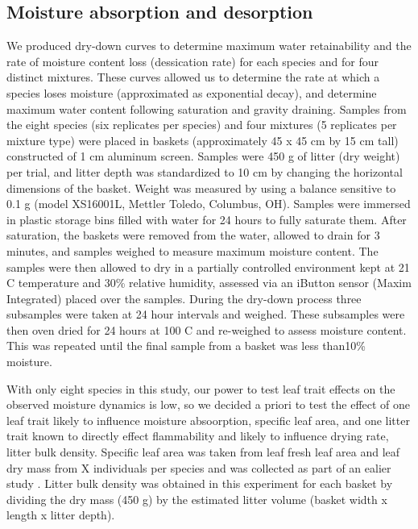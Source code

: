 \documentclass[fire,article,submit,moreauthors,pdftex]{Definitions/mdpi}
\begin{document}
\subsection{Moisture absorption and desorption}


We produced dry-down curves to determine maximum water retainability and the rate of moisture content loss (dessication rate) for each species and for four distinct mixtures. These curves allowed us to  determine the rate at which a species loses moisture (approximated as
exponential decay), and determine maximum water content following saturation
and gravity draining. Samples from the eight species (six replicates per
species) and four mixtures (5 replicates per mixture type) were placed in
baskets (approximately 45 x 45 cm by 15 cm tall) constructed of 1 cm aluminum
screen. Samples were 450 g of litter (dry weight) per trial, and litter depth
was standardized to 10 cm by changing the horizontal dimensions of the basket.
Weight was measured by using a balance sensitive to 0.1 g (model XS16001L,
Mettler Toledo, Columbus, OH). Samples were immersed in plastic storage bins
filled with water for 24 hours to fully saturate them. After saturation, the
baskets were removed from the water, allowed to drain for 3 minutes, and
samples weighed to measure maximum moisture content. The samples were then
allowed to dry in a partially controlled environment kept at 21 C temperature
and 30\% relative humidity, assessed via an iButton sensor (Maxim Integrated)
placed over the samples. During the dry-down process three subsamples were
taken at 24 hour intervals and weighed. These subsamples were then oven dried
for 24 hours at 100 C and re-weighed to assess moisture content. This was
repeated until the final sample from a basket was less than10\% moisture.




With only eight species in this study, our power to test leaf trait effects on the observed moisture dynamics is low, so we decided a priori to test the effect of one leaf trait likely to influence moisture absoorption, specific leaf area, and one litter trait known to directly effect flammability and likely to influence drying rate, litter bulk density. Specific leaf area was taken from leaf fresh leaf area and leaf dry mass from X individuals per species and was collected as part of an ealier study \cite{Magalhaes+Schwilk-2012}.  Litter bulk density was obtained in this experiment for each basket by dividing the dry mass (450 g) by the estimated litter volume (basket width x length x litter depth).
\end{document}
